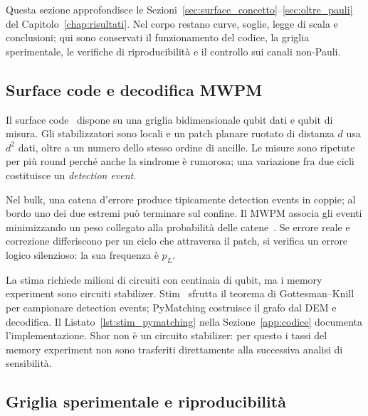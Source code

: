 \begin{onehalfspace}

Questa sezione approfondisce le Sezioni~\ref{sec:surface_concetto}--\ref{sec:oltre_pauli}
del Capitolo~\ref{chap:risultati}. Nel corpo restano curve, soglie, legge
di scala e conclusioni; qui sono conservati il funzionamento del codice,
la griglia sperimentale, le verifiche di riproducibilità e il controllo
sui canali non-Pauli.

\subsection{Surface code e decodifica MWPM}
\label{app:surface_teoria}

Il surface code~\cite{kitaev2003,fowler2012} dispone su una griglia
bidimensionale qubit dati e qubit di misura. Gli stabilizzatori sono locali
e un patch planare ruotato di distanza $d$ usa $d^2$ dati, oltre a un
numero dello stesso ordine di ancille. Le misure sono ripetute per più
round perché anche la sindrome è rumorosa; una variazione fra due cicli
costituisce un \emph{detection event}.

Nel bulk, una catena d'errore produce tipicamente detection events in
coppie; al bordo uno dei due estremi può terminare sul confine. Il
\ac{MWPM} associa gli eventi minimizzando un peso collegato alla
probabilità delle catene~\cite{pymatching2021}. Se errore reale e
correzione differiscono per un ciclo che attraversa il patch, si verifica
un errore logico silenzioso: la sua frequenza è $p_L$.

La stima richiede milioni di circuiti con centinaia di qubit, ma i memory
experiment sono circuiti stabilizer. Stim~\cite{stim2021} sfrutta il
teorema di Gottesman--Knill per campionare detection events; PyMatching
costruisce il grafo dal \ac{DEM} e decodifica. Il Listato~\ref{lst:stim_pymatching}
nella Sezione~\ref{app:codice} documenta l'implementazione. Shor non è un
circuito stabilizer: per questo i tassi del memory experiment non sono
trasferiti direttamente alla successiva analisi di sensibilità.

\subsection{Griglia sperimentale e riproducibilità}
\label{app:surface_protocollo}


\end{onehalfspace}
